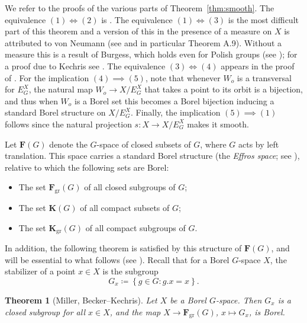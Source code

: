 \documentclass{amsart}
\numberwithin{equation}{subsection}
\newtheorem{thm}{Theorem}[section]
\begin{document}
We refer to the proofs of the various parts of Theorem~\ref{thm:smooth}. The equivalence \(\left(1\right)\iff\left(2\right)\) is \cite[Proposition 5.4.4]{gao2008invariant}. The equivalence \(\left(1\right)\iff\left(3\right)\) is the most difficult part of this theorem and a version of this in the presence of a measure on \(X\) is attributed to von Neumann (see \cite[Appendix A]{zimmer2013ergodic} and in particular Theorem A.9). Without a measure this is a result of Burgess, which holds even for Polish groups (see \cite[Corollary 5.4.12]{gao2008invariant}); for a proof due to Kechris see \cite[Proposition 5.4.10 and Theorem 5.4.11]{gao2008invariant}. The equivalence \(\left(3\right)\iff\left(4\right)\) appears in the proof of \cite[Proposition 3.4.5]{gao2008invariant}. For the implication \(\left(4\right)\implies\left(5\right)\), note that whenever
\(W_{o}\) is a transversal for \(E_{G}^{X}\), the natural map \(W_{o}\to X/E_{G}^{X}\) that takes a point to its orbit is a bijection, and thus when \(W_{o}\) is a Borel set this becomes a Borel bijection inducing a standard Borel structure on \(X/E_{G}^{X}\). Finally, the implication \(\left(5\right)\implies\left(1\right)\) follows since the natural projection \(s:X\to X/E_{G}^{X}\) makes it smooth.

\bigskip

Let \(\mathbf{F}\left(G\right)\) denote the \(G\)-space of closed subsets of \(G\), where \(G\) acts by left translation. This space carries a standard Borel structure (the \emph{Effros space}; see \cite[Exercise (12.7) \& \S12.E]{kechris2012descriptive}), relative to which the following sets are Borel:
\begin{itemize}
    \item The set \(\mathbf{F}_{\mathrm{gr}}\left(G\right)\) of all closed subgroups of \(G\);
    \item The set \(\mathbf{K}\left(G\right)\) of all compact subsets of \(G\);
    \item The set \(\mathbf{K}_{\mathrm{gr}}\left(G\right)\) of all compact subgroups of \(G\).
\end{itemize}

In addition, the following theorem is satisfied by this structure of \(\mathbf{F}\left(G\right)\), and will be essential to what follows (see \cite[Theorems 3.3.2 \& 8.2.1]{gao2008invariant}). Recall that for a Borel \(G\)-space \(X\), the stabilizer of a point \(x\in X\) is the subgroup
\[G_{x}\coloneqq\left\{g\in G:g.x=x\right\}.\]

\begin{thm}[Miller, Becker--Kechris]
\label{thm:miller}
Let \(X\) be a Borel \(G\)-space. Then \(G_{x}\) is a closed subgroup for all \(x\in X\), and the map \(X\to\mathbf{F}_{\mathrm{gr}}\left(G\right)\), \(x\mapsto G_{x}\), is Borel.
\end{thm}
\end{document}
